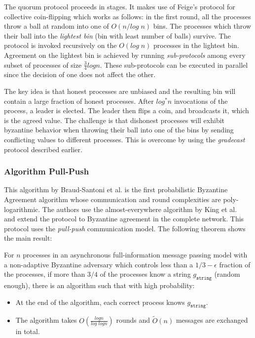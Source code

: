 The quorum protocol proceeds in stages. It makes use of Feige's protocol \cite{Feige99} for collective coin-flipping which works as follows: in the first round, all the processes throw a ball at random into one of $O(n/log\;n)$ bins. The processes which throw their ball into the \textit{lightest bin} (bin with least number of balls) survive. The protocol is invoked recursively on the $O(log\;n)$ processes in the lightest bin. Agreement on the lightest bin is achieved by running \textit{sub-protocols} among every subset of processes of size $\frac{3}{4}logn$. These sub-protocols can be executed in parallel since the decision of one does not affect the other.

The key idea is that honest processes are unbiased and the resulting bin will contain a large fraction of honest processes. After $log^* n$ invocations of the process, a leader is elected. The leader then flips a coin, and broadcasts it, which is the agreed value. The challenge is that dishonest processes will exhibit byzantine behavior when throwing their ball into one of the bins by sending conflicting values to different processes. This is overcome by using the \textit{gradecast} protocol described earlier. 

\subsubsection{Algorithm Pull-Push \cite{BGH13}}
This algorithm by Braud-Santoni et al. \cite{BGH13} is the first probabilistic Byzantine Agreement algorithm whose communication and round complexities are poly-logarithmic. The authors use the almost-everywhere algorithm by King et al.~\cite{KSSV06} and extend the protocol to Byzantine agreement in the complete network. This protocol uses the \textit{pull-push} communication model. The following theorem shows the main result: 


\begin{theorem}
For $n$ processes in an asynchronous full-information message passing model with a non-adaptive Byzantine adversary which controls less than a $1/3 - \epsilon$ fraction of the processes, if more than $3/4$ of the processes know a string $g_{\mathtt{string}}$ (random enough), there is an algorithm such that with high probability:
\begin{itemize}
\item At the end of the algorithm, each correct process knows $g_{\mathtt{string}}$.
\item The algorithm takes $O(\frac{logn}{log \; logn})$ rounds and $\tilde{O}(n)$ messages are exchanged in total. 
\end{itemize}
\end{theorem}


